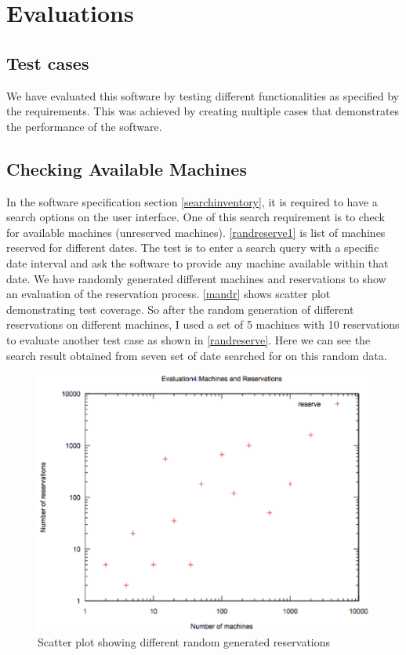 \chapter{Evaluations} 
\label{chap:refs}
\label{chap:ch5_abbr}
\section{Test cases}
We have evaluated this software by testing different functionalities as specified by the requirements. This was achieved by creating multiple cases that demonstrates the performance of the software. 
\section*{Checking Available Machines}
In the software specification section \ref{searchinventory}, it is required to have a search options on the user interface. One of this search requirement is to check for available machines (unreserved machines). \autoref{randreserve1} is list of machines reserved for different dates. The test is to enter a search query with a specific date interval and ask the software to provide any machine available within that date. We have randomly generated different machines and reservations to show an evaluation of the reservation process. \autoref{mandr} shows scatter plot demonstrating test coverage. So after the random generation of different reservations on different machines, I used a set of 5 machines with 10 reservations to evaluate another test case as shown in \autoref{randreserve}. Here we can see the search result obtained from seven set of date searched for on this random data.
\begin{figure}
\includegraphics[width=\linewidth]{mandr.eps}
\caption{Scatter plot showing different random generated reservations}
\label{mandr}
\end{figure}

